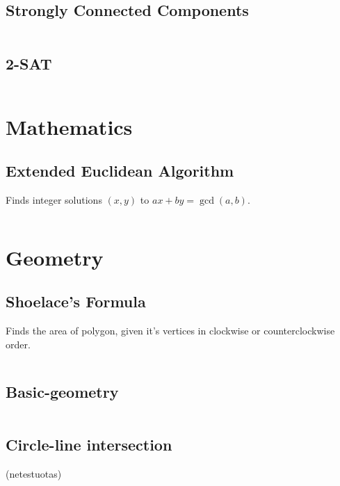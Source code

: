 \documentclass[8pt,a4paper,landscape,oneside]{amsart}
\newcommand{\code}[1]{\inputminted[fontsize=\normalsize,baselinestretch=1]{cpp}{_code/#1}}
\begin{document}
\begin{multicols*}{3}
	\code{graphs/hungarian_algorithm.cpp}
	
	\subsection{Strongly Connected Components}
	
	\code{graphs/strongly_connected_components.cpp}
	
	\subsection{2-SAT}
	
	\code{graphs/2sat.cpp}

\section{Mathematics}

	\subsection{Extended Euclidean Algorithm}
	
	Finds integer solutions $(x, y)$ to $ax + by = \gcd(a, b)$.
	
	\code{math/extended_euclidean_algorithm.cpp}
	
\section{Geometry}

	\subsection{Shoelace's Formula}
	
	Finds the area of polygon, given it's vertices in clockwise or counterclockwise order.
	
	\code{geometry/shoelace.cpp}

	\subsection{Basic-geometry}
	
	\code{geometry/basic_geometry.cpp}
	
	\subsection{Circle-line intersection}
	
	(netestuotas)
	

\end{multicols*}
\end{document}

